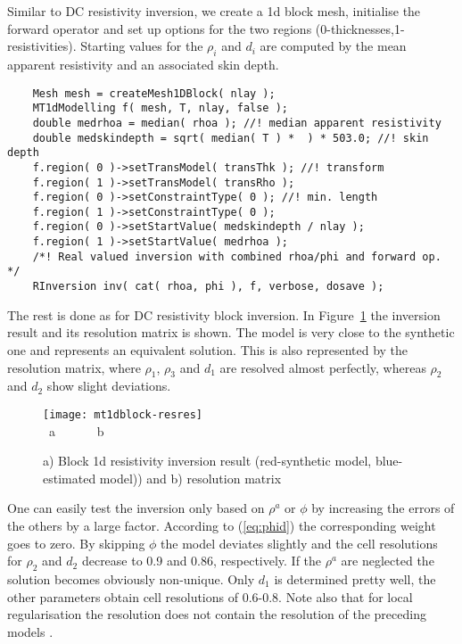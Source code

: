 Similar to DC resistivity inversion, we create a 1d block mesh, initialise the forward operator and set up options for the two regions (0-thicknesses,1-resistivities).
Starting values for the $\rho_i$ and $d_i$ are computed by the mean apparent resistivity and an associated skin depth.
\begin{lstlisting}
    Mesh mesh = createMesh1DBlock( nlay );
    MT1dModelling f( mesh, T, nlay, false );
    double medrhoa = median( rhoa ); //! median apparent resistivity
    double medskindepth = sqrt( median( T ) *  ) * 503.0; //! skin depth
    f.region( 0 )->setTransModel( transThk ); //! transform
    f.region( 1 )->setTransModel( transRho );
    f.region( 0 )->setConstraintType( 0 ); //! min. length
    f.region( 1 )->setConstraintType( 0 );
    f.region( 0 )->setStartValue( medskindepth / nlay );
    f.region( 1 )->setStartValue( medrhoa );
    /*! Real valued inversion with combined rhoa/phi and forward op. */
    RInversion inv( cat( rhoa, phi ), f, verbose, dosave );
\end{lstlisting}

The rest is done as for DC resistivity block inversion.
In Figure~\ref{fig:mt1dblock-resres} the inversion result and its resolution matrix is shown.
The model is very close to the synthetic one and represents an equivalent solution.
This is also represented by the resolution matrix, where $\rho_1$, $\rho_3$ and $d_1$ are resolved almost perfectly, whereas $\rho_2$ and $d_2$ show slight deviations.
\begin{figure}[htbp]
\centering\texttt{[image: mt1dblock-resres]}\\[-3ex]
~\hfill a\hfill ~ \hfill ~~~~~b \hfill ~ \hfill ~ \hfill ~
\caption{a) Block 1d resistivity inversion result (red-synthetic model, blue-estimated model)) and b) resolution matrix}\label{fig:mt1dblock-resres}
\end{figure}

One can easily test the inversion only based on $\rho^a$ or $\phi$ by increasing the errors of the others by a large factor.
According to (\ref{eq:phid}) the corresponding weight goes to zero.
By skipping $\phi$ the model deviates slightly and the cell resolutions for $\rho_2$ and $d_2$ decrease to 0.9 and 0.86, respectively. If the $\rho^a$ are neglected the solution becomes obviously non-unique. Only $d_1$ is determined pretty well, the other parameters obtain cell resolutions of 0.6-0.8. Note also that for local regularisation the resolution does not contain the resolution of the preceding models \citep{friedel03}.


